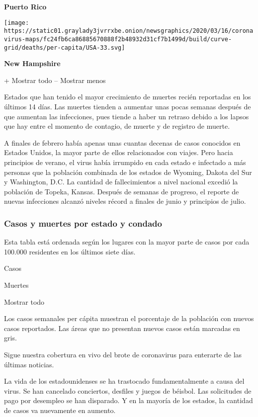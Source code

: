 \textbf{Puerto Rico}

\href{https://www.nytimes3xbfgragh.onion/interactive/2020/us/new-hampshire-coronavirus-cases.html}{}

\texttt{[image: https://static01.graylady3jvrrxbe.onion/newsgraphics/2020/03/16/coronavirus-maps/fc24fb6ca86885670888f2b48932d31cf7b1499d/build/curve-grid/deaths/per-capita/USA-33.svg]}

\textbf{New Hampshire}

+ Mostrar todo -- Mostrar menos

Estados que han tenido el mayor crecimiento de muertes recién reportadas
en los últimos 14 días. Las muertes tienden a aumentar unas pocas
semanas después de que aumentan las infecciones, pues tiende a haber un
retraso debido a los lapsos que hay entre el momento de contagio, de
muerte y de registro de muerte.

A finales de febrero había apenas unas cuantas decenas de casos
conocidos en Estados Unidos, la mayor parte de ellos relacionados con
viajes. Pero hacia principios de verano, el virus había irrumpido en
cada estado e infectado a más personas que la población combinada de los
estados de Wyoming, Dakota del Sur y Washington, D.C. La cantidad de
fallecimientos a nivel nacional excedió la población de Topeka, Kansas.
Después de semanas de progreso, el reporte de nuevas infecciones alcanzó
niveles récord a finales de junio y principios de julio.

\hypertarget{casos-y-muertes-por-estado-y-condado}{%
\subsubsection{Casos y muertes por estado y
condado}\label{casos-y-muertes-por-estado-y-condado}}

Esta tabla está ordenada según los lugares con la mayor parte de casos
por cada 100.000 residentes en los últimos siete días.

Casos

Muertes

Mostrar todo

Los casos semanales per cápita muestran el porcentaje de la población
con nuevos casos reportados. Las áreas que no presentan nuevos casos
están marcadas en gris.

Sigue nuestra cobertura en vivo del brote de coronavirus para enterarte
de las últimas noticias.

La vida de los estadounidenses se ha trastocado fundamentalmente a causa
del virus. Se han cancelado conciertos, desfiles y juegos de béisbol.
Las solicitudes de pago por desempleo se han disparado. Y en la mayoría
de los estados, la cantidad de casos va nuevamente en aumento.

